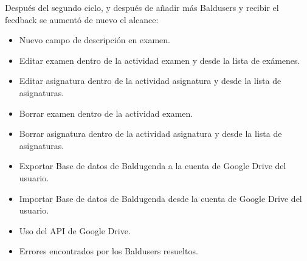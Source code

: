 Después del segundo ciclo, y después de añadir más Baldusers y recibir el feedback se aumentó de nuevo el alcance:
\begin{itemize}
	\item Nuevo campo de descripción en examen.
	\item Editar examen dentro de la actividad examen y desde la lista de exámenes.
	\item Editar asignatura dentro de la actividad asignatura y desde la lista de asignaturas.
	\item Borrar examen dentro de la actividad examen.
	\item Borrar asignatura dentro de la actividad asignatura y desde la lista de asignaturas.
	\item Exportar Base de datos de Baldugenda a la cuenta de Google Drive del usuario.
	\item Importar Base de datos de Baldugenda desde la cuenta de Google Drive del usuario.
	\item Uso del API de Google Drive.
	\item Errores encontrados por los Baldusers resueltos.
\end{itemize}

